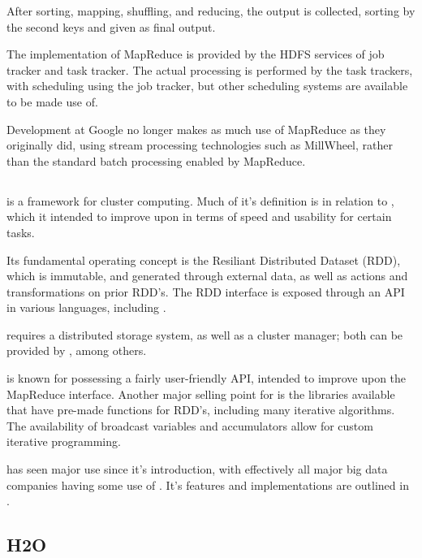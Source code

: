 After sorting, mapping, shuffling, and reducing, the output is
collected, sorting by the second keys and given as final output.

The implementation of MapReduce is provided by the HDFS services of job
tracker and task tracker. The actual processing is performed by the task
trackers, with scheduling using the job tracker, but other scheduling
systems are available to be made use of.

Development at Google no longer makes as much use of MapReduce as they
originally did, using stream processing technologies such as MillWheel,
rather than the standard batch processing enabled by
MapReduce\cite{akidau2013millwheel}.

\subsection{}\label{sec:spark}

 is a framework for cluster computing\cite{zaharia2010spark}. Much
of it's definition is in relation to , which it intended to
improve upon in terms of speed and usability for certain tasks.

Its fundamental operating concept is the Resiliant Distributed Dataset
(RDD), which is immutable, and generated through external data, as well
as actions and transformations on prior RDD's. The RDD interface is
exposed through an API in various languages, including \R.

 requires a distributed storage system, as well as a cluster
manager; both can be provided by , among others.

 is known for possessing a fairly user-friendly API, intended to
improve upon the MapReduce interface. Another major selling point for
 is the libraries available that have pre-made functions for RDD's,
including many iterative algorithms. The availability of broadcast
variables and accumulators allow for custom iterative programming.

 has seen major use since it's introduction, with effectively all
major big data companies having some use of . It's features and
implementations are outlined in \textcite{zaharia2016apache}.

\subsection{H2O}\label{sec:h2o}

